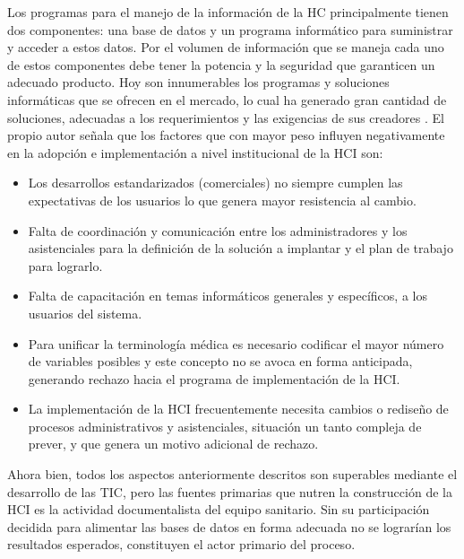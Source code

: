 Los programas para el manejo de la información de la HC principalmente tienen dos componentes: una base de datos y un programa informático para suministrar y acceder a estos datos. Por el volumen de información que se maneja cada uno de estos componentes debe tener la potencia y la seguridad que garanticen un adecuado producto. Hoy son innumerables los programas y soluciones informáticas que se ofrecen en el mercado, lo cual ha generado gran cantidad de soluciones, adecuadas a los requerimientos y las exigencias de sus creadores . El propio autor señala que los factores que con mayor peso influyen negativamente en la adopción e implementación a nivel institucional de la HCI son:  
\begin{itemize}
	\item	Los desarrollos estandarizados (comerciales) no siempre cumplen las expectativas de los usuarios lo que genera mayor resistencia al cambio.  
	
	\item Falta de coordinación y comunicación entre los administradores y los asistenciales para la definición de la solución a implantar y el plan de trabajo para lograrlo.  
	
	\item Falta de capacitación en temas informáticos generales y específicos, a los usuarios del sistema. 
	
	\item Para unificar la terminología médica es necesario codificar el mayor número de variables posibles y este concepto no se avoca en forma anticipada, generando rechazo hacia el programa de implementación de la HCI. 
	
	\item La implementación de la HCI frecuentemente necesita cambios o rediseño de procesos administrativos y asistenciales, situación un tanto compleja de prever, y que genera un motivo adicional de rechazo.  
\end{itemize}

Ahora bien, todos los aspectos anteriormente descritos son superables mediante el desarrollo de las TIC, pero las fuentes primarias que nutren la construcción de la HCI es la actividad documentalista del equipo sanitario. Sin su participación decidida para alimentar las bases de datos en forma adecuada no se lograrían los resultados esperados, constituyen el actor primario del proceso.

